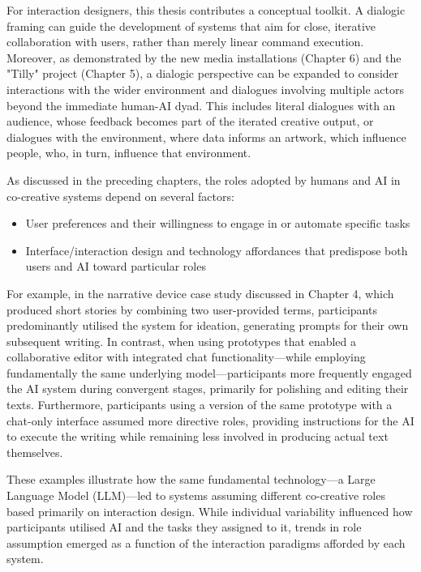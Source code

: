 For interaction designers, this thesis contributes a conceptual toolkit. A dialogic framing can guide the development of systems that aim for close, iterative collaboration with users, rather than merely linear command execution. Moreover, as demonstrated by the new media installations (Chapter 6) and the "Tilly" project (Chapter 5), a dialogic perspective can be expanded to consider interactions with the wider environment and dialogues involving multiple actors beyond the immediate human-AI dyad. This includes literal dialogues with an audience, whose feedback becomes part of the iterated creative output, or dialogues with the environment, where data informs an artwork, which influence people, who, in turn, influence that environment.



As discussed in the preceding chapters, the roles adopted by humans and AI in co-creative systems depend on several factors:

\begin{itemize}
    \item User preferences and their willingness to engage in or automate specific tasks
    \item Interface/interaction design and technology affordances that predispose both users and AI toward particular roles
\end{itemize}

For example, in the narrative device case study discussed in Chapter 4, which produced short stories by combining two user-provided terms, participants predominantly utilised the system for ideation, generating prompts for their own subsequent writing. In contrast, when using prototypes that enabled a collaborative editor with integrated chat functionality—while employing fundamentally the same underlying model—participants more frequently engaged the AI system during convergent stages, primarily for polishing and editing their texts. Furthermore, participants using a version of the same prototype with a chat-only interface assumed more directive roles, providing instructions for the AI to execute the writing while remaining less involved in producing actual text themselves.

These examples illustrate how the same fundamental technology—a Large Language Model (LLM)—led to systems assuming different co-creative roles based primarily on interaction design. While individual variability influenced how participants utilised AI and the tasks they assigned to it, trends in role assumption emerged as a function of the interaction paradigms afforded by each system.

